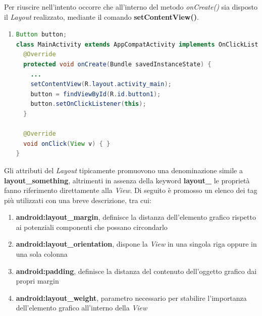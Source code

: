 \documentclass{article}
\begin{document}
Per riuscire nell'intento occorre che all'interno del metodo \textit{onCreate()} sia disposto il \textit{Layout} realizzato, mediante il comando \textbf{setContentView()}. \vspace*{7pt}
\begin{enumerate}
  \renewcommand{\labelenumi}{ }
  \item 
  \begin{lstlisting}[language=JAVA, title=Caricamento del layout all'interno della activity]
Button button;
class MainActivity extends AppCompatActivity implements OnClickListener{
  @Override
  protected void onCreate(Bundle savedInstanceState) {
    ...
    setContentView(R.layout.activity_main);
    button = findViewById(R.id.button1);
    button.setOnClickListener(this); 
  }
    
  @Override 
  void onClick(View v) { }
}
  \end{lstlisting}
\end{enumerate}
Gli attributi del \textit{Layout} tipicamente promuovono una denominazione simile a \textbf{layout\_something}, altrimenti in assenza della keyword \textbf{layout\_} le proprietà fanno riferimento direttamente alla \textit{View}. Di seguito è promosso un elenco dei tag più utilizzati con una breve descrizione, tra cui:
\begin{enumerate}
  \renewcommand{\labelenumi}{-}
  \itemsep0em
  \item \textbf{android:layout\_margin}, definisce la distanza dell'elemento grafico rispetto ai potenziali componenti che possano circondarlo
  \item \textbf{android:layout\_orientation}, dispone la \textit{View} in una singola riga oppure in una sola colonna
  \item \textbf{android:padding}, definisce la distanza del contenuto dell'oggetto grafico dai propri margin 
  \item \textbf{android:layout\_weight}, parametro necessario per stabilire l'importanza dell'elemento grafico all'interno della \textit{View} 
\end{enumerate}
\end{document}
